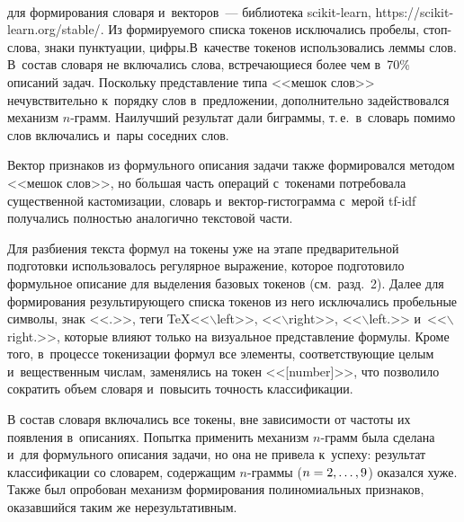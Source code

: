 \begin{figure*} %
\vspace*{1pt}
\begin{center}
   \mbox{%
\epsfxsize=153.297mm
}
\end{center}
\vspace*{-11pt}
\vspace*{-10pt}
\end{figure*}

\begin{multicols}{2}

\noindent
 для формирования 
словаря и~векторов~--- биб\-лио\-те\-ка scikit-learn, {\sf https://scikit-learn.org/stable/}. 
Из формируемого списка токенов исключались про\-белы, стоп-сло\-ва, знаки 
пунктуации, циф\-ры.\linebreak В~качестве токенов использовались леммы слов. 
В~со\-став словаря не включались слова, встре\-ча\-ющи\-еся более чем в~70\% 
описаний задач. Поскольку пред\-став\-ле\-ние типа <<мешок слов>> 
нечувствительно к~порядку слов в~предложении, дополнитель\-но задействовался 
механизм $n$-грамм. Наилучший результат дали биграммы, т.\,е.\ в~словарь 
помимо слов включались и~пары соседних слов.
{

}
      
      Вектор признаков из формульного описания задачи так\-же 
формировался методом <<мешок слов>>, но б$\acute{\mbox{о}}$льшая часть операций 
с~токенами по\-тре\-бо\-ва\-ла существенной кастомизации, словарь  
и~век\-тор-гис\-то\-грамма с~мерой tf-idf получались пол\-ностью аналогично 
текс\-то\-вой части.
      
      Для разбиения текс\-та формул на токены уже на этапе 
предварительной подготовки использовалось регулярное выражение, которое 
подготовило формульное описание для выделения базовых токенов (см.\ 
разд.~2). Далее для формирования ре\-зуль\-ти\-ру\-юще\-го спис\-ка токенов из него 
исключались пробельные символы, знак <<.>>, теги \TeX <<$\backslash$left>>, 
<<$\backslash$right>>, <<$\backslash$left.>> и~<<$\backslash$right.>>, которые влияют только на 
визуальное пред\-став\-ле\-ние формулы. Кроме того, в~процессе токенизации 
формул все элементы, со\-от\-вет\-ст\-ву\-ющие целым и~вещественным чис\-лам, 
заменялись на токен <<[number]>>, что позволило со\-кра\-тить объем словаря 
и~повысить точ\-ность классификации.
      
      В состав словаря включались все токены, вне за\-ви\-си\-мости от час\-то\-ты 
их появления в~описаниях. По\-пыт\-ка применить механизм $n$-грамм была 
сделана и~для формульного описания задачи, но она не привела к~успеху: 
результат классификации со словарем, содержащим $n$-грам\-мы ($n\hm=2, 
\ldots , 9$) оказался хуже. Также был опробован механизм формирования 
полиномиальных признаков, ока\-зав\-ший\-ся таким же нерезультативным.
      

\end{multicols}
